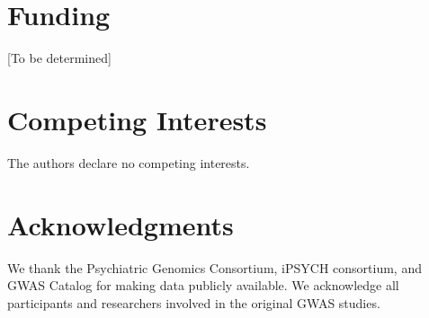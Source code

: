 \documentclass[12pt,letterpaper]{article}
\theoremstyle{definition}
\theoremstyle{remark}
\begin{document}
\section*{Funding}
[To be determined]

\section*{Competing Interests}
The authors declare no competing interests.

\section*{Acknowledgments}
We thank the Psychiatric Genomics Consortium, iPSYCH consortium, and GWAS Catalog for making data publicly available. We acknowledge all participants and researchers involved in the original GWAS studies.
\end{document}
